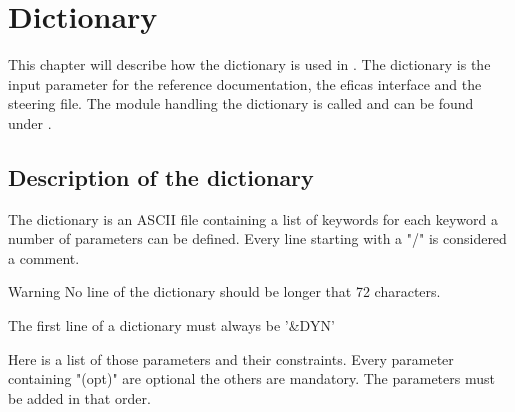 \chapter{Dictionary}

This chapter will describe how the dictionary is used in \telemacsystem. The
dictionary is the input parameter for the reference documentation, the eficas
interface and the steering file. The module handling the dictionary is called
\damocles and can be found under .

\section{Description of the dictionary}
\label{ref:descDico}
The dictionary is an ASCII file containing a list of keywords for each keyword
a number of parameters can be defined. Every line starting with a "/" is
considered a comment.\\
\begin{WarningBlock}{Warning}
No line of the dictionary should be longer that 72 characters.
\end{WarningBlock}

The first line of a dictionary must always be '\&DYN'

Here is a list of those parameters and their constraints. Every parameter
containing "(opt)" are optional the others are mandatory. The parameters must
be added in that order.

